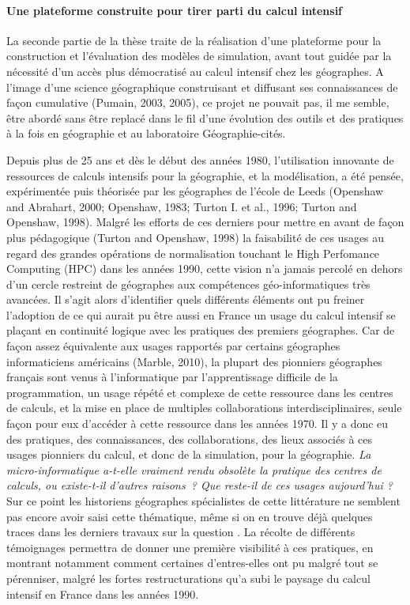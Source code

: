 \paragraph*{Une plateforme construite pour tirer parti du calcul intensif}

La seconde partie de la thèse traite de la réalisation d'une plateforme pour la construction et l'évaluation des modèles de simulation, avant tout guidée par la nécessité d'un accès plus  démocratisé au calcul intensif chez les géographes. A l'image d'une science géographique construisant et diffusant ses connaissances de façon cumulative (Pumain, 2003, 2005)⁠, ce projet ne pouvait pas, il me semble, être abordé sans être replacé dans le fil d'une évolution des outils et des pratiques à la fois en géographie et au laboratoire Géographie-cités.

Depuis plus de 25 ans et dès le début des années 1980, l'utilisation innovante de ressources de calculs intensifs pour la géographie, et la modélisation, a été pensée, expérimentée puis théorisée par les géographes de l'école de Leeds (Openshaw and Abrahart, 2000; Openshaw, 1983; Turton I. et al., 1996; Turton and Openshaw, 1998)⁠. Malgré les efforts de ces derniers pour mettre en avant de façon plus pédagogique (Turton and Openshaw, 1998) la faisabilité de ces usages au regard des grandes opérations de normalisation touchant le High Perfomance Computing (HPC) dans les années 1990, cette vision n'a jamais percolé en dehors d'un cercle restreint de géographes aux compétences géo-informatiques très avancées. Il s'agit alors d'identifier quels différents éléments ont pu freiner l'adoption de ce qui aurait pu être aussi en France un usage du calcul intensif se plaçant en continuité logique avec les pratiques des premiers géographes. Car de façon assez équivalente aux usages rapportés par certains géographes informaticiens américains (Marble, 2010)⁠, la plupart des pionniers géographes français sont venus à l'informatique par l'apprentissage difficile de la programmation, un usage répété et complexe de cette ressource dans les centres de calculs, et la mise en place de multiples collaborations interdisciplinaires, seule façon pour eux d'accéder à cette ressource dans les années 1970. Il y a donc eu des pratiques, des connaissances, des collaborations, des lieux associés à ces usages pionniers du calcul, et donc de la simulation, pour la géographie. \textit{La micro-informatique a-t-elle vraiment rendu obsolète la pratique des centres de calculs, ou existe-t-il d'autres raisons ? Que reste-il de ces usages aujourd'hui ?} Sur ce point les historiens géographes spécialistes de cette littérature ne semblent pas encore avoir saisi cette thématique, même si on en trouve déjà quelques traces dans les derniers travaux sur la question \autocite{Cuyala2014}⁠. La récolte de différents témoignages permettra de donner une première visibilité à ces pratiques, en montrant notamment comment certaines d'entres-elles ont pu malgré tout se pérenniser, malgré les fortes restructurations qu'a subi le paysage du calcul intensif en France dans les années 1990.

